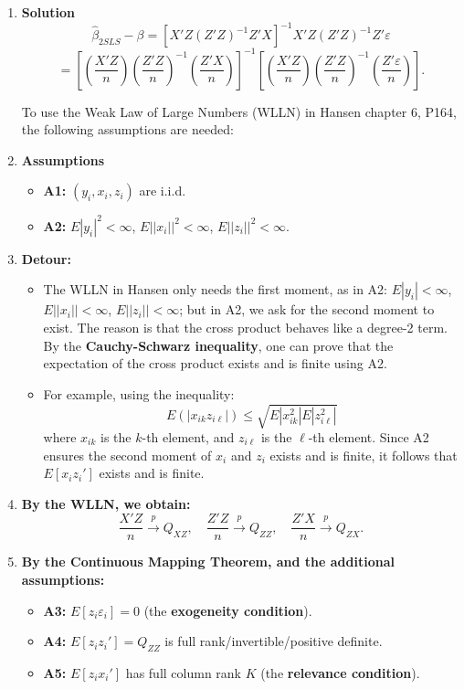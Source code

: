 \documentclass[12pt, oneside]{article}
\begin{document}
\begin{enumerate} 
    \item \textbf{Solution}
\[
\hat{\beta}_{2SLS} - \beta = \left[ X'Z(Z'Z)^{-1}Z'X \right]^{-1} X'Z(Z'Z)^{-1}Z'\varepsilon
\]
\[
= \left[ \left(\frac{X'Z}{n}\right) \left(\frac{Z'Z}{n}\right)^{-1} \left(\frac{Z'X}{n}\right) \right]^{-1} 
\left[ \left(\frac{X'Z}{n}\right) \left(\frac{Z'Z}{n}\right)^{-1} \left(\frac{Z'\varepsilon}{n}\right) \right].
\]

To use the Weak Law of Large Numbers (WLLN) in Hansen chapter 6, P164, the following assumptions are needed:

 \item \textbf*{Assumptions}
\begin{itemize}
    \item \textbf{A1:} \( (y_i, x_i, z_i) \) are i.i.d.
    \item \textbf{A2:} \( E|y_i|^2 < \infty \), \( E||x_i||^2 < \infty \), \( E||z_i||^2 < \infty \).
\end{itemize}

 \item \textbf*{Detour:}
\begin{itemize}
    \item The WLLN in Hansen only needs the first moment, as in A2: \( E|y_i| < \infty \), \( E||x_i|| < \infty \), \( E||z_i|| < \infty \); but in A2, we ask for the second moment to exist. The reason is that the cross product behaves like a degree-2 term. By the \textbf{Cauchy-Schwarz inequality}, one can prove that the expectation of the cross product exists and is finite using A2.
    \item For example, using the inequality:
    \[
    E(|x_{ik} z_{i\ell} |) \leq \sqrt{E|x_{ik}^2| E|z_{i\ell}^2|}
    \]
    where \( x_{ik} \) is the \( k \)-th element, and \( z_{i\ell} \) is the \( \ell \)-th element. Since A2 ensures the second moment of \( x_i \) and \( z_i \) exists and is finite, it follows that \( E[x_i z_i'] \) exists and is finite.
\end{itemize}

 \item \textbf*{By the WLLN, we obtain:}
\[
\frac{X'Z}{n} \xrightarrow{p} Q_{XZ}, \quad \frac{Z'Z}{n} \xrightarrow{p} Q_{ZZ}, \quad \frac{Z'X}{n} \xrightarrow{p} Q_{ZX}.
\]

\item \textbf*{By the Continuous Mapping Theorem, and the additional assumptions:}
\begin{itemize}
    \item \textbf{A3:} \( E[z_i \varepsilon_i] = 0 \) (the \textbf{exogeneity condition}).
    \item \textbf{A4:} \( E[z_i z_i'] = Q_{ZZ} \) is full rank/invertible/positive definite.
    \item \textbf{A5:} \( E[z_i x_i'] \) has full column rank \( K \) (the \textbf{relevance condition}).
\end{itemize}


\end{enumerate}
\end{document}
